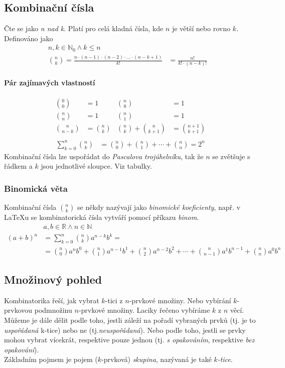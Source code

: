 \documentclass[12pt]{article}
\begin{document}
\subsection{Kombinační čísla}
Čte se jako \emph{n nad k}. Platí pro celá kladná čísla, kde $n$ je větší nebo rovno $k$. Definováno jako
\begin{align}
n,k \in \mathbb{N}_0 \land k \leq n && \\
\binom{n}{k} = \frac{n \cdot (n-1) \cdot (n-2) \cdot \dotso  \cdot (n-k+1)}{k!} &= \frac{n!}{k! \cdot (n-k)!}
\end{align}
\paragraph{Pár zajímavých vlastností}
\begin{align*}
\binom{0}{0} &= 1 & \binom{n}{0} &=1\\
\binom{n}{n} &= 1 & \binom{n}{1} &=1\\
\binom{n}{n-k} &= \binom{n}{k} & \binom{n}{k} + \binom{n}{k+1} &= \binom{n+1}{k+1}\\
\end{align*}
\begin{align*}
\sum^n_{k=0} \binom{n}{k} &= \binom{n}{0} + \binom{n}{1} + \cdots + \binom{n}{n} = 2^n
\end{align*}
Kombinační čísla lze uspořádat do \emph{Pascalova trojúhelníku}, tak že $n$ se zvětšuje s řádkem a $k$ jsou jednotlivé sloupce. Viz tabulky.
\subsubsection{Binomická věta}
\label{sec:binom_veta}
Kombinační čísla $\binom{n}{k}$ se někdy nazývají jako \emph{binomické koeficienty}, např. v \LaTeX u se kombinatorická čísla vytváří pomocí příkazu \emph{binom}.
\begin{align}
&a,b \in \mathbb{R} \land n \in \mathbb{N}&\\
\left( a+ b \right)^n  &= \sum^{n}_{k=0} \binom{n}{k}a^{n-k}b^{k} =\\
&= \binom{n}{0}a^n  b^0 +  \binom{n}{1}a^{n-1}b^{1} +  \binom{n}{2}a^{n-2}b^{2} + \dotsb +  \binom{n}{n-1}a^{1}b^{n-1} +  \binom{n}{n}a^{0}b^{n}
\end{align}
\subsection{Množinový pohled}
Kombinatorika řeší, jak vybrat $k$-tici z $n$-prvkové množiny. Nebo vybírání $k$-prvkovou podmnožinu $n$-prvkové množiny. Laciky řečeno vybíráme $k$ z $n$ věcí.\\
Můžeme je dále dělit podle toho, jestli záleží na pořadí vybraných prvků (tj. je to \emph{uspořádaná} k-tice) nebo ne (tj.\emph{neuspořádaná}). Nebo podle toho, jestli se prvky mohou vybrat vícekrát, respektive pouze jednou (tj. \emph{s opakováním}, respektive \emph{bez opakování}).\\
Základním pojmem je pojem ($k$-prvková) \emph{skupina}, nazývaná je také \emph{$k$-tice}.
\end{document}
